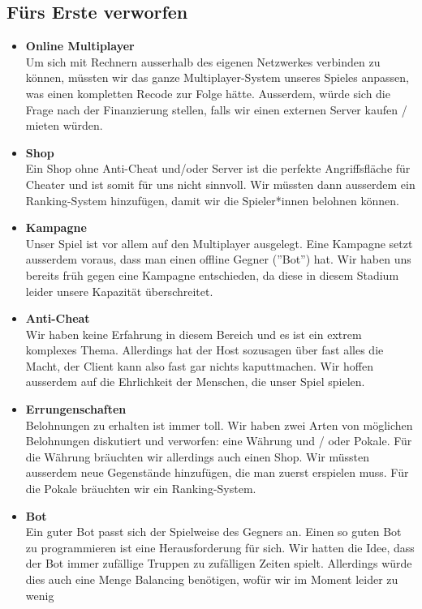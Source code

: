 \subsection{Fürs Erste verworfen}
\begin{itemize}
    \item \textbf{Online Multiplayer} \\
        Um sich mit Rechnern ausserhalb des eigenen Netzwerkes verbinden zu können, müssten wir das ganze Multiplayer-System unseres Spieles anpassen, was einen kompletten \gls{Recode} zur Folge hätte. 
        Ausserdem, würde sich die Frage nach der Finanzierung stellen, falls wir einen externen Server kaufen / mieten würden. 
    \item \textbf{Shop} \\
        Ein Shop ohne Anti-Cheat und/oder Server ist die perfekte Angriffsfläche für \gls{Cheater} und ist somit für uns nicht sinnvoll. Wir müssten dann ausserdem ein Ranking-System
        hinzufügen, damit wir die Spieler*innen belohnen können.
    \item \textbf{Kampagne} \\
        Unser Spiel ist vor allem auf den Multiplayer ausgelegt. Eine Kampagne setzt ausserdem voraus, dass man einen offline Gegner (''Bot'') hat. Wir haben uns bereits 
        früh gegen eine Kampagne entschieden, da diese in diesem Stadium leider unsere Kapazität überschreitet.
    \item \textbf{Anti-Cheat} \\
        Wir haben keine Erfahrung in diesem Bereich und es ist ein extrem komplexes Thema. Allerdings hat der Host sozusagen über fast alles die Macht, der Client kann also fast
        gar nichts kaputtmachen. Wir hoffen ausserdem auf die Ehrlichkeit der Menschen, die unser Spiel spielen.
    \item \textbf{Errungenschaften} \\
        Belohnungen zu erhalten ist immer toll. Wir haben zwei Arten von möglichen Belohnungen diskutiert und verworfen: eine Währung und / oder Pokale.
        Für die Währung bräuchten wir allerdings auch einen Shop. Wir müssten ausserdem neue Gegenstände hinzufügen,
        die man zuerst erspielen muss. Für die Pokale bräuchten wir ein Ranking-System.
    \item \textbf{Bot} \\
        Ein guter Bot passt sich der Spielweise des Gegners an. Einen so guten Bot zu programmieren ist eine Herausforderung für sich. Wir hatten die Idee,
        dass der Bot immer zufällige Truppen zu zufälligen Zeiten spielt. Allerdings würde dies auch eine Menge Balancing benötigen, wofür wir im Moment leider zu wenig

\end{itemize}
